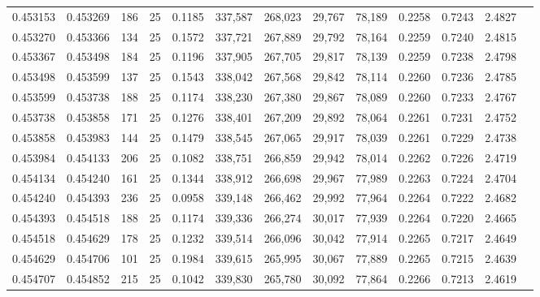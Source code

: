 \begin{tabular}{rrrrrrrrrrrrr}
0.453153 & 0.453269 &   186 &  25 &                                     0.1185 & 337,587 & 268,023 &  29,767 &  78,189 & 0.2258 & 0.7243 & 2.4827 \\
0.453270 & 0.453366 &   134 &  25 &                                     0.1572 & 337,721 & 267,889 &  29,792 &  78,164 & 0.2259 & 0.7240 & 2.4815 \\
0.453367 & 0.453498 &   184 &  25 &                                     0.1196 & 337,905 & 267,705 &  29,817 &  78,139 & 0.2259 & 0.7238 & 2.4798 \\
0.453498 & 0.453599 &   137 &  25 &                                     0.1543 & 338,042 & 267,568 &  29,842 &  78,114 & 0.2260 & 0.7236 & 2.4785 \\
0.453599 & 0.453738 &   188 &  25 &                                     0.1174 & 338,230 & 267,380 &  29,867 &  78,089 & 0.2260 & 0.7233 & 2.4767 \\
0.453738 & 0.453858 &   171 &  25 &                                     0.1276 & 338,401 & 267,209 &  29,892 &  78,064 & 0.2261 & 0.7231 & 2.4752 \\
0.453858 & 0.453983 &   144 &  25 &                                     0.1479 & 338,545 & 267,065 &  29,917 &  78,039 & 0.2261 & 0.7229 & 2.4738 \\
0.453984 & 0.454133 &   206 &  25 &                                     0.1082 & 338,751 & 266,859 &  29,942 &  78,014 & 0.2262 & 0.7226 & 2.4719 \\
0.454134 & 0.454240 &   161 &  25 &                                     0.1344 & 338,912 & 266,698 &  29,967 &  77,989 & 0.2263 & 0.7224 & 2.4704 \\
0.454240 & 0.454393 &   236 &  25 &                                     0.0958 & 339,148 & 266,462 &  29,992 &  77,964 & 0.2264 & 0.7222 & 2.4682 \\
0.454393 & 0.454518 &   188 &  25 &                                     0.1174 & 339,336 & 266,274 &  30,017 &  77,939 & 0.2264 & 0.7220 & 2.4665 \\
0.454518 & 0.454629 &   178 &  25 &                                     0.1232 & 339,514 & 266,096 &  30,042 &  77,914 & 0.2265 & 0.7217 & 2.4649 \\
0.454629 & 0.454706 &   101 &  25 &                                     0.1984 & 339,615 & 265,995 &  30,067 &  77,889 & 0.2265 & 0.7215 & 2.4639 \\
0.454707 & 0.454852 &   215 &  25 &                                     0.1042 & 339,830 & 265,780 &  30,092 &  77,864 & 0.2266 & 0.7213 & 2.4619 \\

\end{tabular}
